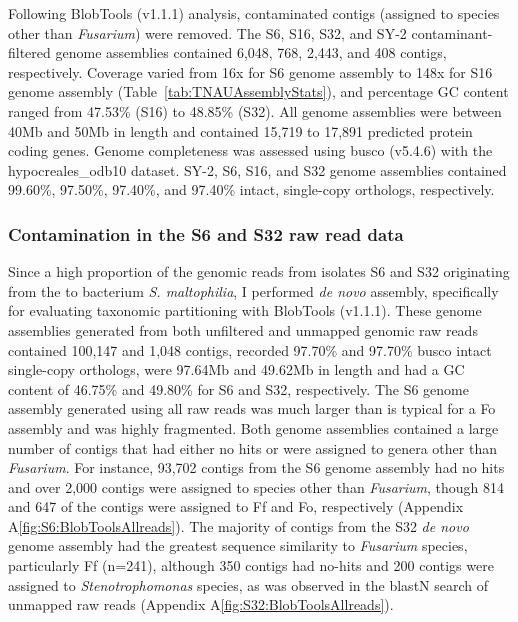 Following BlobTools (v1.1.1) analysis, contaminated contigs (assigned to species other than \textit{Fusarium}) were removed. The  S6, S16, S32, and SY-2 contaminant-filtered genome assemblies contained 6,048, 768, 2,443, and 408 contigs, respectively. Coverage varied from 16x for S6 genome assembly to 148x for S16 genome assembly (Table~\ref{tab:TNAUAssemblyStats}), and percentage GC content ranged from 47.53\% (S16) to 48.85\% (S32). All genome assemblies were between 40Mb and 50Mb in length and contained 15,719 to 17,891 predicted protein coding genes. Genome completeness was assessed using \ac{busco} (v5.4.6) with the hypocreales\_odb10 dataset. SY-2, S6, S16, and S32 genome assemblies contained 99.60\%, 97.50\%, 97.40\%, and 97.40\% intact, single-copy orthologs, respectively. 



\subsubsection{Contamination in the S6 and S32 raw read data}
\label{sec:BlobToolsOfS6S32-allreads}

Since a high proportion of the genomic reads  from isolates S6 and S32 originating from the to bacterium \textit{S. maltophilia}, I performed \textit{de novo} assembly, specifically for evaluating taxonomic partitioning with BlobTools (v1.1.1). These genome assemblies generated from both unfiltered and unmapped genomic raw reads contained 100,147 and 1,048 contigs, recorded  97.70\% and 97.70\% \ac{busco} intact single-copy orthologs, were 97.64Mb and 49.62Mb in length and had a GC content of 46.75\% and 49.80\% for S6 and S32, respectively. The S6 genome assembly generated using all raw reads was much larger than is typical for a \ac{Fo} assembly and was highly fragmented. Both genome assemblies contained a large number of contigs that had either no hits or were assigned to genera other than \textit{Fusarium}.  For instance, 93,702 contigs from the S6 genome assembly had no hits and over 2,000 contigs were assigned to species other than \textit{Fusarium}, though 814 and 647 of the contigs were assigned to \ac{Ff} and \ac{Fo}, respectively (Appendix A\ref{fig:S6:BlobToolsAllreads}). The majority of contigs from the S32 \textit{de novo} genome assembly had the greatest sequence similarity to \textit{Fusarium} species, particularly \ac{Ff} (n=241), although 350 contigs had no-hits and 200 contigs were assigned to \textit{Stenotrophomonas} species, as was observed in the \acs{blast}N search of unmapped raw reads (Appendix A\ref{fig:S32:BlobToolsAllreads}). 

